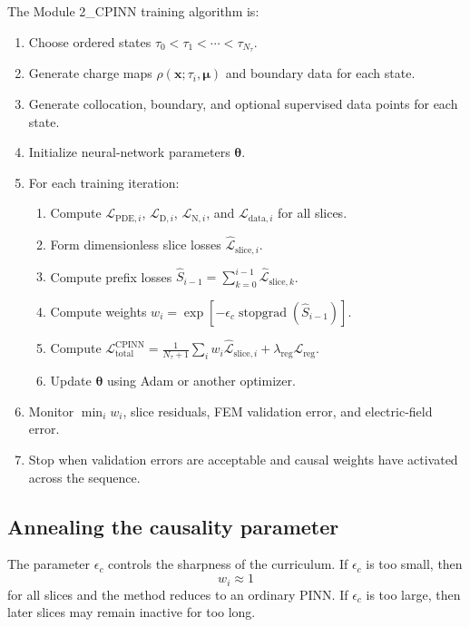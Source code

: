 \documentclass[11pt]{article}
\newcommand{\thetav}{\bm{\theta}}
\newcommand{\xv}{\bm{x}}
\newcommand{\muv}{\bm{\mu}}
\newcommand{\Lreg}{\mathcal{L}_{\mathrm{reg}}}
\newcommand{\Ltot}{\mathcal{L}_{\mathrm{total}}}
\newcommand{\taud}{\tau}
\newcommand{\stgrad}{\operatorname{stopgrad}}
\begin{document}
The Module 2\_CPINN training algorithm is:

\begin{enumerate}[leftmargin=2em]
\item Choose ordered states $\taud_0<\taud_1<\cdots<\taud_{N_\taud}$.
\item Generate charge maps $\rho(\xv;\taud_i,\muv)$ and boundary data for each state.
\item Generate collocation, boundary, and optional supervised data points for each state.
\item Initialize neural-network parameters $\thetav$.
\item For each training iteration:
\begin{enumerate}[leftmargin=2em]
\item Compute $\mathcal{L}_{\mathrm{PDE},i}$, $\mathcal{L}_{\mathrm{D},i}$, $\mathcal{L}_{\mathrm{N},i}$, and $\mathcal{L}_{\mathrm{data},i}$ for all slices.
\item Form dimensionless slice losses $\widehat{\mathcal{L}}_{\mathrm{slice},i}$.
\item Compute prefix losses $\hat{S}_{i-1}=\sum_{k=0}^{i-1}\widehat{\mathcal{L}}_{\mathrm{slice},k}$.
\item Compute weights $w_i=\exp[-\epsilon_c\stgrad(\hat{S}_{i-1})]$.
\item Compute $\Ltot^{\mathrm{CPINN}}=\frac{1}{N_\taud+1}\sum_i w_i\widehat{\mathcal{L}}_{\mathrm{slice},i}+\lambda_{\mathrm{reg}}\Lreg$.
\item Update $\thetav$ using Adam or another optimizer.
\end{enumerate}
\item Monitor $\min_i w_i$, slice residuals, FEM validation error, and electric-field error.
\item Stop when validation errors are acceptable and causal weights have activated across the sequence.
\end{enumerate}

\subsection{Annealing the causality parameter}

The parameter $\epsilon_c$ controls the sharpness of the curriculum. If $\epsilon_c$ is too small, then
\begin{equation}
w_i\approx 1
\end{equation}
for all slices and the method reduces to an ordinary PINN. If $\epsilon_c$ is too large, then later slices may remain inactive for too long.
\end{document}
